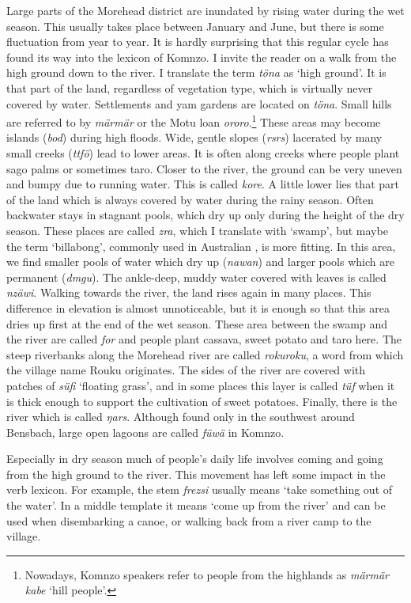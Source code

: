Large parts of the Morehead district are inundated by rising water during the wet season. This usually takes place between January and June, but there is some fluctuation from year to year. It is hardly surprising that this regular cycle has found its way into the lexicon of Komnzo. I invite the reader on a walk from the high ground down to the river. I translate the term \emph{töna} as `high ground'. It is that part of the land, regardless of vegetation type, which is virtually never covered by water. Settlements and yam gardens are located on \emph{töna}. Small hills are referred to by \emph{märmär} or the Motu loan \emph{ororo}.\footnote{Nowadays, Komnzo speakers refer to people from the highlands as \emph{märmär kabe} `hill people'.} These areas may become islands (\emph{bod}) during high floods. Wide, gentle slopes (\emph{rsrs}) lacerated by many small creeks (\emph{ttfö}) lead to lower areas. It is often along creeks where people plant sago palms or sometimes taro. Closer to the river, the ground can be very uneven and bumpy due to running water. This is called \emph{kore}. A little lower lies that part of the land which is always covered by water during the rainy season. Often backwater stays in stagnant pools, which dry up only during the height of the dry season. These places are called \emph{zra}, which I translate with `swamp', but maybe the term `billabong', commonly used in Australian , is more fitting. In this area, we find smaller pools of water which dry up  (\emph{nawan}) and larger pools which are permanent (\emph{dmgu}). The ankle-deep, muddy water covered with leaves is called \emph{nzäwi}. Walking towards the river, the land rises again in many places. This difference in elevation is almost unnoticeable, but it is enough so that this area dries up first at the end of the wet season. These area between the swamp and the river are called \emph{for} and people plant cassava, sweet potato and taro here. The steep riverbanks along the Morehead river are called \emph{rokuroku}, a word from which the village name Rouku originates. The sides of the river are covered with patches of \emph{süfi} `floating grass', and in some places this layer is called \emph{tüf} when it is thick enough to support the cultivation of sweet potatoes. Finally, there is the river which is called \emph{ŋars}. Although found only in the southwest around Bensbach, large open lagoons are called \emph{füwä} in Komnzo.

Especially in dry season much of people's daily life involves coming and going from the high ground to the river. This movement has left some impact in the verb lexicon. For example, the stem \emph{frezsi} usually means `take something out of the water'. In a middle template it means `come up from the river' and can be used when disembarking a canoe, or walking back from a river camp to the village.

